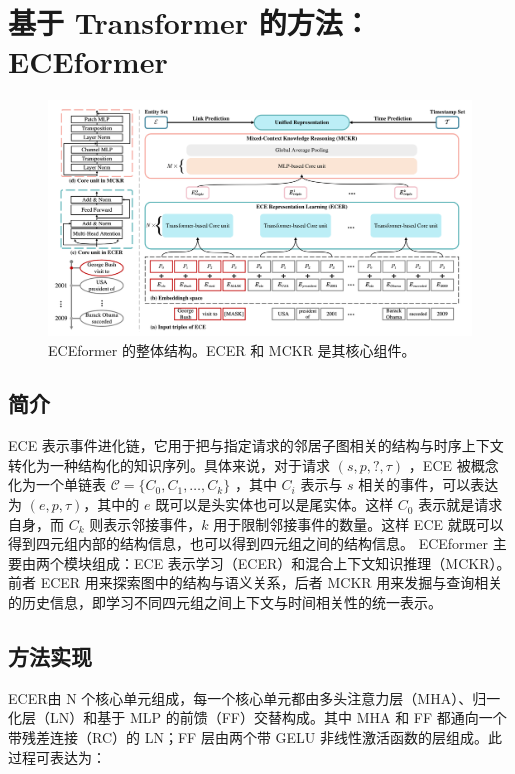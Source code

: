 \documentclass[a4paper, AutoFakeBold]{article}
\begin{document}
\section{基于 Transformer 的方法：ECEformer}



\begin{figure}
	\captionsetup{width=0.85\textwidth}
	\centering
	\includegraphics[width=1.0\textwidth]{figures/ECEformer.png}
	\caption{ECEformer 的整体结构\cite{6-2024}。ECER 和 MCKR 是其核心组件。}
	\label{fig:enter-label}
\end{figure}



\subsection{简介}

ECE 表示事件进化链，它用于把与指定请求的邻居子图相关的结构与时序上下文转化为一种结构化的知识序列。具体来说，对于请求 $(s,p,?,\tau)$ ，ECE 被概念化为一个单链表 ${\mathcal C}=\{C_0,C_1,\dots,C_k\}$ ，其中 $C_i$ 表示与 $s$ 相关的事件，可以表达为 $(e,p,\tau)$，其中的 $e$ 既可以是头实体也可以是尾实体。这样 $C_0$ 表示就是请求自身，而 $C_k$ 则表示邻接事件，$k$ 用于限制邻接事件的数量。这样 ECE 就既可以得到四元组内部的结构信息，也可以得到四元组之间的结构信息。
ECEformer 主要由两个模块组成：ECE 表示学习（ECER）和混合上下文知识推理（MCKR）。前者 ECER 用来探索图中的结构与语义关系，后者 MCKR 用来发掘与查询相关的历史信息，即学习不同四元组之间上下文与时间相关性的统一表示。


\subsection{方法实现}

ECER由 N 个核心单元组成，每一个核心单元都由多头注意力层（MHA）、归一化层（LN）和基于 MLP 的前馈（FF）交替构成。其中 MHA 和 FF 都通向一个带残差连接（RC）的 LN；FF 层由两个带 GELU 非线性激活函数的层组成。此过程可表达为：
\end{document}
